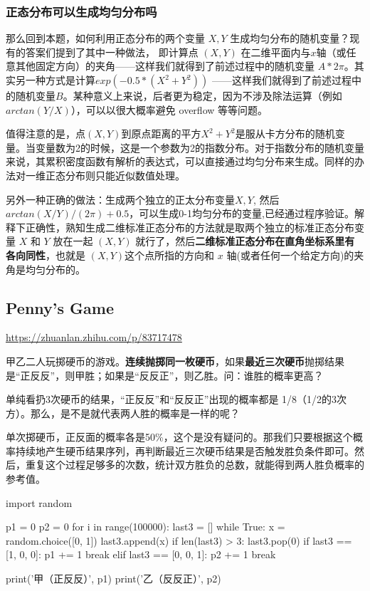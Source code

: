 \documentclass[12pt]{article}
\begin{document}
\subsubsection{正态分布可以生成均匀分布吗}
那么回到本题，如何利用正态分布的两个变量 $X,Y$ 生成均匀分布的随机变量？现有的答案们提到了其中一种做法， 即计算点 $(X,Y)$ 在二维平面内与$x$轴（或任意其他固定方向）的夹角——这样我们就得到了前述过程中的随机变量 $A * 2\pi$。其实另一种方式是计算$exp( -0.5 * (X^2 + Y^2))$ ——这样我们就得到了前述过程中的随机变量$B$。某种意义上来说，后者更为稳定，因为不涉及除法运算（例如$arctan(Y/X)$），可以以很大概率避免 overflow 等等问题。

值得注意的是，点$(X,Y)$到原点距离的平方$X^2 + Y^2$是服从卡方分布的随机变量。当变量数为2的时候，这是一个参数为2的指数分布。对于指数分布的随机变量来说，其累积密度函数有解析的表达式，可以直接通过均匀分布来生成。同样的办法对一维正态分布则只能近似数值处理。

另外一种正确的做法：生成两个独立的正太分布变量$X,Y$, 然后$arctan(X/Y)/(2\pi)+0.5$，可以生成0-1均匀分布的变量,已经通过程序验证。解释下正确性，熟知生成二维标准正态分布的方法就是取两个独立的标准正态分布变量 $X$ 和 $Y$ 放在一起 $(X, Y)$ 就行了，然后\textbf{二维标准正态分布在直角坐标系里有各向同性}，也就是 $(X, Y)$这个点所指的方向和 $x$ 轴(或者任何一个给定方向)的夹角是均匀分布的。

\subsection{Penny's Game}
\url{https://zhuanlan.zhihu.com/p/83717478}

甲乙二人玩掷硬币的游戏。\textbf{连续抛掷同一枚硬币}，如果\textbf{最近三次硬币}抛掷结果是“正反反”，则甲胜；如果是“反反正”，则乙胜。问：谁胜的概率更高？

单纯看扔3次硬币的结果，“正反反”和“反反正”出现的概率都是 1/8（1/2的3次方）。那么，是不是就代表两人胜的概率是一样的呢？

单次掷硬币，正反面的概率各是50\%，这个是没有疑问的。那我们只要根据这个概率持续地产生硬币结果序列，再判断最近三次硬币结果是否触发胜负条件即可。然后，重复这个过程足够多的次数，统计双方胜负的总数，就能得到两人胜负概率的参考值。
\begin{python}
import random

p1 = 0
p2 = 0
for i in range(100000):
    last3 = []
    while True:
        x = random.choice([0, 1])
        last3.append(x)
        if len(last3) > 3:
            last3.pop(0)
        if last3 == [1, 0, 0]:
            p1 += 1
            break
        elif last3 == [0, 0, 1]:
            p2 += 1
            break

print('甲（正反反）', p1)
print('乙（反反正）', p2)
\end{python}
\end{document}
